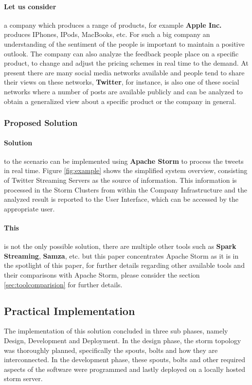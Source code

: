 \documentclass[runningheads,a4paper]{llncs}[2015/06/24]
\begin{document}
\paragraph{Let us consider} a company which produces a range of products, for example \textbf{Apple Inc.} produces IPhones, IPods, MacBooks, etc. For such a big company an understanding of the sentiment of the people is important to maintain a positive outlook. The company can also analyze the feedback people place on a specific product, to change and adjust the pricing schemes in real time to the demand.  At present there are many social media networks available and people tend to share their views on these networks,  \textbf{Twitter}, for instance, is also one of these social networks where a number of posts are available publicly and can be analyzed to obtain a generalized view about a specific product or the company in general.

\subsubsection{Proposed Solution}

\paragraph{Solution} to the scenario can be implemented using \textbf{Apache Storm} to process the tweets in real time. Figure \ref{fig:example} shows the simplified system overview, consisting of Twitter Streaming Servers as the source of information. This information is processed in the Storm Clusters from within the Company Infrastructure and the analyzed result is reported to the User Interface, which can be accessed by the appropriate user.

\paragraph{This} is not the only possible solution, there are multiple other tools such as \textbf{Spark Streaming}, \textbf{Samza}, etc. but this paper concentrates Apache Storm as it is in the spotlight of this paper, for further details regarding other available tools and their comparisons with Apache Storm, please consider the section \ref{sec:toolcomparision} for further details.

\subsection{Practical Implementation}
The implementation of this solution concluded in three sub phases, namely Design, Development and Deployment. In the design phase, the storm topology was thoroughly planned, specifically the spouts, bolts and how they are interconnected. In the development phase, these spouts, bolts and other required aspects of the software were programmed and lastly deployed on a locally hosted storm server.
\end{document}
